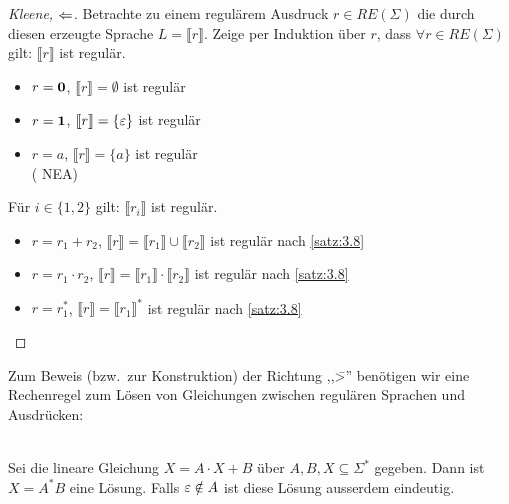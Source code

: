 \begin{proof}[Kleene, $\<=$]
Betrachte zu einem regulärem Ausdruck $r\in RE(\Sigma)$ die durch diesen erzeugte Sprache $L=\llbracket r \rrbracket$. Zeige per Induktion über $r$, dass $ \forall r\in RE(\Sigma) $ gilt: $ \llbracket r \rrbracket$ ist regulär.
    	\begin{description}[font=\normalfont]
      \item[I.A.:] \hfill
        \vspace{-\baselineskip}
        \begin{itemize}
        \item $r = \mathbf{0}$, $\llbracket r \rrbracket = \emptyset$ ist regulär
        \item $r = \mathbf{1}$, $\llbracket r \rrbracket = \{ \varepsilon \}$ ist regulär
        \item $r = a$, $\llbracket r \rrbracket = \{ a \}$ ist regulär \\
          (
    			 \quad\acs{NEA}) 
        \end{itemize}
        \item[I.V.:] Für $i \in \{1, 2\}$ gilt: $\llbracket r_i \rrbracket$ ist regulär.
    		\item[I.S.:] \hfill
          \vspace{-\baselineskip}
          \begin{itemize}
          \item $r = r_1 + r_2$, $\llbracket r \rrbracket = \llbracket r_1 \rrbracket \cup \llbracket r_2 \rrbracket$ ist regulär nach \autoref{satz:3.8}
          \item $r = r_1 \cdot r_2$, $\llbracket r \rrbracket = \llbracket r_1 \rrbracket \cdot \llbracket r_2 \rrbracket$ ist regulär nach \autoref{satz:3.8}
          \item $r = r_1^*$, $\llbracket r \rrbracket = \llbracket r_1 \rrbracket^*$ ist regulär nach \autoref{satz:3.8}
          \end{itemize}
		\end{description}
\end{proof}

Zum Beweis (bzw.\ zur Konstruktion) der Richtung ,,\=>'' benötigen wir eine Rechenregel zum Lösen von Gleichungen zwischen regulären Sprachen und Ausdrücken:
\begin{lemma}\label{lem:arden}\ \\
        Sei die lineare Gleichung $X=A\cdot X+B$ über $A, B, X\subseteq \Sigma^*$ gegeben. Dann ist $X=A^*B$ eine Lösung. Falls $\varepsilon \notin A$ ist diese Lösung ausserdem eindeutig.
\end{lemma}

